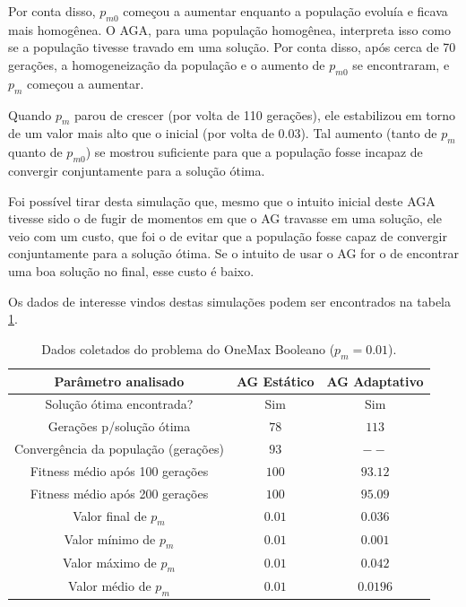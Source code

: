Por conta disso, $p_{m0}$ começou a aumentar enquanto a população evoluía e ficava mais homogênea. O AGA, para uma população homogênea, interpreta isso como se a população tivesse travado em uma solução. Por conta disso, após cerca de 70 gerações, a homogeneização da população e o aumento de $p_{m0}$ se encontraram, e $p_m$ começou a aumentar.

Quando $p_m$ parou de crescer (por volta de 110 gerações), ele estabilizou em torno de um valor mais alto que o inicial (por volta de 0.03). Tal aumento (tanto de $p_m$ quanto de $p_{m0}$) se mostrou suficiente para que a população fosse incapaz de convergir conjuntamente para a solução ótima.

Foi possível tirar desta simulação que, mesmo que o intuito inicial deste AGA tivesse sido o de fugir de momentos em que o AG travasse em uma solução, ele veio com um custo, que foi o de evitar que a população fosse capaz de convergir conjuntamente para a solução ótima. Se o intuito de usar o AG for o de encontrar uma boa solução no final, esse custo é baixo.

Os dados de interesse vindos destas simulações podem ser encontrados na tabela \ref{tab:onemax_boolean}.

\begin{table}
\caption{Dados coletados do problema do OneMax Booleano ($p_m = 0.01$).}
\label{tab:onemax_boolean}

\center
\begin{tabular}{ccc}
  \hline
	Parâmetro analisado 					& AG Estático	& AG Adaptativo   \\
	\hline
	Solução ótima encontrada?				& Sim			& Sim		\\
	Gerações p/solução ótima				& $78$			& $113$		\\
	Convergência da população (gerações)	& $93$			& $--$		\\
	Fitness médio após 100 gerações			& $100$			& $93.12$	\\
	Fitness médio após 200 gerações 		& $100$			& $95.09$	\\
	Valor final de $p_m$					& $0.01$ 		& $0.036$	\\
	Valor mínimo de $p_m$					& $0.01$		& $0.001$	\\
	Valor máximo de $p_m$					& $0.01$		& $0.042$	\\
	Valor médio de $p_m$					& $0.01$		& $0.0196$	\\
	\hline
\end{tabular}
\end{table}

